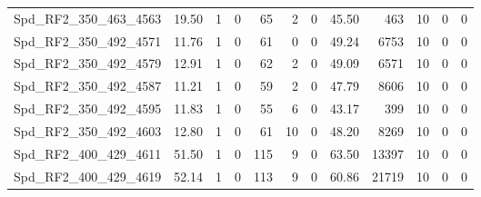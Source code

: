 \begin{longtable}[c]{@{}lrrrrrrrrrrr@{}}
Spd\_RF2\_350\_463\_4563     & 19.50                  & 1                       & 0                       & 65                     & 2                       & 0                       & 45.50                   & 463                      & 10                       & 0                        & 0                        \\
Spd\_RF2\_350\_492\_4571     & 11.76                  & 1                       & 0                       & 61                     & 0                       & 0                       & 49.24                   & 6753                     & 10                       & 0                        & 0                        \\
Spd\_RF2\_350\_492\_4579     & 12.91                  & 1                       & 0                       & 62                     & 2                       & 0                       & 49.09                   & 6571                     & 10                       & 0                        & 0                        \\
Spd\_RF2\_350\_492\_4587     & 11.21                  & 1                       & 0                       & 59                     & 2                       & 0                       & 47.79                   & 8606                     & 10                       & 0                        & 0                        \\
Spd\_RF2\_350\_492\_4595     & 11.83                  & 1                       & 0                       & 55                     & 6                       & 0                       & 43.17                   & 399                      & 10                       & 0                        & 0                        \\
Spd\_RF2\_350\_492\_4603     & 12.80                  & 1                       & 0                       & 61                     & 10                      & 0                       & 48.20                   & 8269                     & 10                       & 0                        & 0                        \\
Spd\_RF2\_400\_429\_4611     & 51.50                  & 1                       & 0                       & 115                    & 9                       & 0                       & 63.50                   & 13397                    & 10                       & 0                        & 0                        \\
Spd\_RF2\_400\_429\_4619     & 52.14                  & 1                       & 0                       & 113                    & 9                       & 0                       & 60.86                   & 21719                    & 10                       & 0                        & 0                        \\

\end{longtable}
